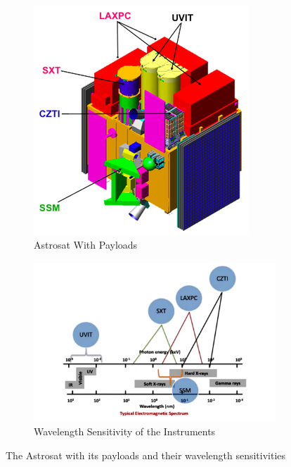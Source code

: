 \documentclass[a4paper,twoside]{report}
\numberwithin{equation}{section}
\begin{document}
\paragraph{}
\begin{figure}[h]
\begin{subfigure}{0.4\textwidth}
\includegraphics[width=1.0\linewidth]{Astrosat_folded_large.png} 
\caption{Astrosat With Payloads}
\label{Astrosat With Payload}
\end{subfigure}
\begin{subfigure}{0.6\textwidth}
\includegraphics[width=1.0\linewidth, height=6cm]{Im2.jpg}
\caption{Wavelength Sensitivity of the Instruments}
\label{Wavelength Sensitivity}
\end{subfigure}
\caption{The Astrosat with its payloads and their wavelength sensitivities}
\label{fig:Wavelength Sensitivity}
\end{figure}
\end{document}
